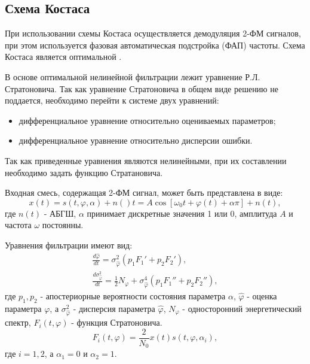 \subsection{Схема Костаса}

При использовании схемы Костаса осуществляется демодуляция 2-ФМ сигналов, при этом используется фазовая автоматическая подстройка (ФАП) частоты. Схема
Костаса является оптимальной \cite{shahtarin-wiener-kalman}.

В основе оптимальной нелинейной фильтрации лежит уравнение Р.Л. Стратоновича. Так как уравнение Стратоновича в общем виде решению не поддается, необходимо
перейти к системе двух уравнений:
\begin{itemize}
	\item дифференциальное уравнение относительно оцениваемых параметров;
	\item дифференциальное уравнение относительно дисперсии ошибки.
\end{itemize}

Так как приведенные уравнения являются нелинейными, при их составлении необходимо задать функцию Стратановича.

Входная смесь, содержащая 2-ФМ сигнал, может быть представлена в виде:
\begin{equation}
	x(t) = s(t, \varphi, \alpha) + n()t = A \cos \left[ \omega_0t + \varphi(t) +\alpha \pi \right] + n(t),
	\label{eq:sec4_sig}
\end{equation}
где ${n(t)}$ - АБГШ, ${\alpha}$ принимает дискретные значения 1 или 0, амплитуда ${A}$ и частота ${\omega}$ постоянны.

Уравнения фильтрации имеют вид:
\begin{eqnarray}
	\frac{d \hat{\varphi}}{dt} = \sigma_{\hat{\varphi}}^2(p_1 F_{1}' + p_2 F_{2}'), \nonumber \\
	\frac{d \sigma_{\hat{\varphi}}^2}{dt} = \frac{1}{2}N_{\varphi} + \sigma_{\hat{\varphi}}^4(p_1 F_{1}'' + p_2 F_{2}''),
	\label{eq:sec4_filter_eq}
\end{eqnarray}
где ${p_1, p_2}$ - апостериорные вероятности состояния параметра ${\alpha}$, ${\hat{\varphi}}$ - оценка параметра ${\varphi}$, а ${\sigma_{\hat{\varphi}}^2}$ - 
дисперсия параметра ${\hat{\varphi}}$, ${N_{\varphi}}$ - односторонний энергетический спектр, ${F_i(t, \varphi)}$ - функция Стратоновича.
\begin{equation}
	F_i(t, \varphi) = \frac{2}{N_0} x(t)s(t, \varphi, \alpha_i),
	\label{eq:sec4_stratonovicha_eq}
\end{equation}
где ${i = 1, 2}$, а ${\alpha_1 = 0}$ и ${\alpha_2 = 1}$.

